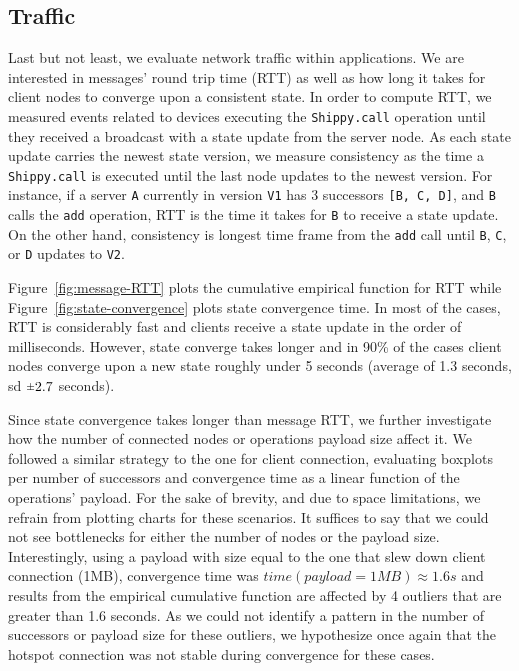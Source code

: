 \subsection{Traffic}
\label{sub:eval:traffic}


Last but not least, we evaluate network traffic within \APIshort applications.
We are interested in messages' round trip time (RTT) as well as how long it takes for client nodes to converge upon a consistent state.
In order to compute RTT, we measured events related to devices executing the \texttt{Shippy.call} operation until they received a broadcast with a state update from the server node.
As each state update carries the newest state version, we measure consistency as the time a \texttt{Shippy.call} is executed until the last node updates to the newest version.
For instance, if a server \texttt{A} currently in version \texttt{V1} has 3 successors \texttt{[B, C, D]}, and \texttt{B} calls the \texttt{add} operation, RTT is the time it takes for \texttt{B} to receive a state update.
On the other hand, consistency is longest time frame from the \texttt{add} call until \texttt{B}, \texttt{C}, or \texttt{D} updates to \texttt{V2}.


Figure~\ref{fig:message-RTT} plots the cumulative empirical function for RTT while Figure~\ref{fig:state-convergence} plots state convergence time.
In most of the cases, RTT is considerably fast and clients receive a state update in the order of milliseconds.
However, state converge takes longer and in 90\% of the cases client nodes converge upon a new state roughly under 5 seconds (average of 1.3 seconds, sd $\rpm 2.7$ seconds).


Since state convergence takes longer than message RTT, we further investigate how the number of connected nodes or operations payload size affect it.
We followed a similar strategy to the one for client connection, evaluating boxplots per number of successors and convergence time as a linear function of the operations' payload.
For the sake of brevity, and due to space limitations, we refrain from plotting charts for these scenarios.
It suffices to say that we could not see bottlenecks for either the number of nodes or the payload size. 
Interestingly, using a payload with size equal to the one that slew down client connection (1MB), convergence time was $time(payload = 1MB) \approx 1.6s$ and results from the empirical cumulative function are affected by 4 outliers that are greater than 1.6 seconds.
As we could not identify a pattern in the number of successors or payload size for these outliers, we hypothesize once again that the hotspot connection was not stable during convergence for these cases.






